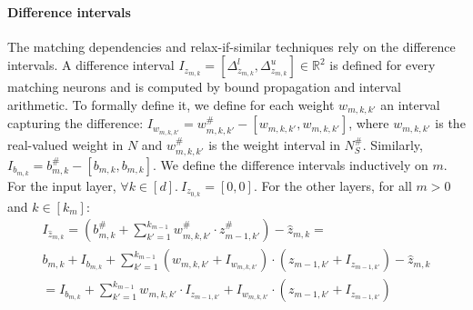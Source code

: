 \paragraph{Difference intervals} The matching dependencies and relax-if-similar techniques rely on the difference intervals.  
A difference interval $I_{z_{m,k}} = [\Delta^l_{z_{m,k}}, \Delta^u_{z_{m,k}}] \in \mathbb{R}^2$ is defined for every matching neurons and is computed by bound propagation and interval arithmetic.
To formally define it, %
we define for each weight $w_{m,k,k'}$ an interval capturing the difference: $I_{w_{m,k,k'}}=w^\#_{m,k,k'}-[w_{m,k,k'},w_{m,k,k'}]$, where $w_{m,k,k'}$ is the real-valued weight in $N$ and $w^\#_{m,k,k'}$ is the weight interval in $N^\#_S$. Similarly, $I_{b_{m,k}}=b^\#_{m,k}-[b_{m,k},b_{m,k}]$. 
We define the difference intervals inductively on $m$.
For the input layer, $\forall k\in[d].\ I_{z_{0,k}}=[0,0]$. 
For the other layers, for all $m>0$ and $k\in[k_m]$: 
\begin{align*}
I_{\hat{z}_{m,k}}=  
\left( {b_{m,k}^\#}+\sum_{k'=1}^{k_{m-1}}{w^\#_{m,k,k'}}\cdot  z^\#_{m-1,k'}\right) - \hat{z}_{m,k} =\phantom{aaaaaaa}\\
b_{m,k}+I_{b_{m,k}}+\sum_{k'=1}^{k_{m-1}}(w_{m,k,k'}+I_{w_{m,k,k'}})\cdot  (z_{m-1,k'}+I_{z_{m-1,k'}}) - \hat{z}_{m,k}\\
=I_{b_{m,k}}+\sum_{k'=1}^{k_{m-1}} w_{m,k,k'} \cdot I_{z_{m-1,k'}} + I_{w_{m,k,k'}}\cdot  (z_{m-1,k'}+I_{z_{m-1,k'}}) 
\end{align*}
